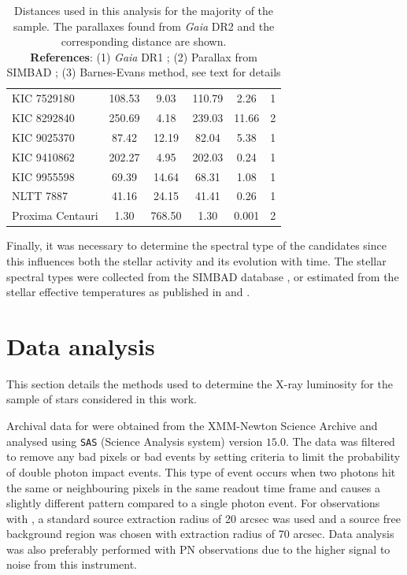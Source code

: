 \begin{table}
{\begin{tabular}{lccccc}
KIC 7529180      & 108.53        & 9.03                   & 110.79                 & 2.26       & 1                 \\
KIC 8292840      & 250.69        & 4.18                   & 239.03                 & 11.66      & 2                 \\
KIC 9025370      & 87.42         & 12.19                  & 82.04                  & 5.38       & 1                 \\
KIC 9410862      & 202.27        & 4.95                   & 202.03                 & 0.24       & 1                 \\
KIC 9955598      & 69.39         & 14.64                  & 68.31                  & 1.08       & 1                 \\
NLTT 7887        & 41.16         & 24.15                  & 41.41                  & 0.26       & 1                 \\
Proxima Centauri & 1.30          & 768.50                 & 1.30                   & 0.001      & 2                 \\
\hline
\end{tabular}}
\caption[Comparison of distances to \textit{Gaia} DR2]{Distances used in this analysis for the majority of the sample. The parallaxes found from \textit{Gaia} DR2 and the corresponding distance are shown.\\ \textbf{References}: (1) \textit{Gaia} DR1 \citep{Gaia_Collaboration_2016_DR1}; (2) Parallax from SIMBAD \citep{Wenger_etal_2000}; (3) Barnes-Evans method, see text for details}
\label{Table:distance_comparison}
\end{table}

Finally, it was necessary to determine the spectral type of the candidates since this influences both the stellar activity and its evolution with time. The stellar spectral types were collected from the SIMBAD database \citep{Wenger_etal_2000}, or estimated from the stellar effective temperatures as published in \citet{Chaplin_etal_2014} and \citet{Silva_Aguirre_etal_2015}.

\section{Data analysis}
This section details the methods used to determine the X-ray luminosity for the sample of stars considered in this work.

Archival data for \XMM were obtained from the XMM-Newton Science Archive and analysed using \texttt{SAS} (Science Analysis system) version $15.0$. The data was filtered to remove any bad pixels or bad events by setting criteria to limit the probability of double photon impact events. This type of event occurs when two photons hit the same or neighbouring pixels in the same readout time frame and causes a slightly different pattern compared to a single photon event. For observations with \XMM, a standard source extraction radius of 20 arcsec was used and a source free background region was chosen with extraction radius of 70 arcsec. Data analysis was also preferably performed with PN observations due to the higher signal to noise from this instrument.

